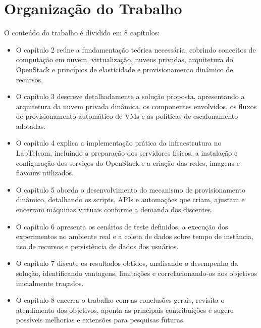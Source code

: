 \section{Organização do Trabalho}
O conteúdo do trabalho é dividido em 8 capítulos:
\begin{itemize}
    \item O capítulo 2 reúne a fundamentação teórica necessária, cobrindo conceitos de computação em nuvem, virtualização, nuvens privadas, arquitetura do OpenStack e princípios de elasticidade e provisionamento dinâmico de recursos.
    
    \item O capítulo 3 descreve detalhadamente a solução proposta, apresentando a arquitetura da nuvem privada dinâmica, os componentes envolvidos, os fluxos de provisionamento automático de VMs e as políticas de escalonamento adotadas.
    
    \item O capítulo 4 explica a implementação prática da infraestrutura no LabTelcom, incluindo a preparação dos servidores físicos, a instalação e configuração dos serviços do OpenStack e a criação das redes, imagens e flavours utilizados.
    
    \item O capítulo 5 aborda o desenvolvimento do mecanismo de provisionamento dinâmico, detalhando os scripts, APIs e automações que criam, ajustam e encerram máquinas virtuais conforme a demanda dos discentes.
    
    \item O capítulo 6 apresenta os cenários de teste definidos, a execução dos experimentos no ambiente real e a coleta de dados sobre tempo de instância, uso de recursos e persistência de dados dos usuários.
    
    \item O capítulo 7 discute os resultados obtidos, analisando o desempenho da solução, identificando vantagens, limitações e correlacionando-os aos objetivos inicialmente traçados.
    
    \item O capítulo 8 encerra o trabalho com as conclusões gerais, revisita o atendimento dos objetivos, aponta as principais contribuições e sugere possíveis melhorias e extensões para pesquisas futuras.
\end{itemize}
